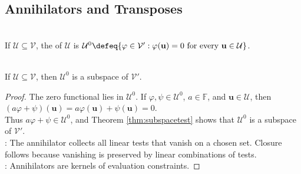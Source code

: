 \subsection{Annihilators and Transposes}
\begin{definition} \\
If $\mathcal{U}\subseteq\mathcal{V}$, the  of $\mathcal{U}$ is $\mathcal{U}^0\defeq\{\varphi\in\mathcal{V}':\varphi(\mathbf{u})=0 \text{ for every } \mathbf{u}\in\mathcal{U}\}$.
\end{definition}

\begin{proposition} \label{prop:annihilator-is-subspace} \\
If $\mathcal{U}\subseteq\mathcal{V}$, then $\mathcal{U}^0$ is a subspace of $\mathcal{V}'$.
\begin{proof}
The zero functional lies in $\mathcal{U}^0$. If $\varphi,\psi\in\mathcal{U}^0$, $a\in\mathbb{F}$, and $\mathbf{u}\in\mathcal{U}$, then $(a\varphi+\psi)(\mathbf{u})=a\varphi(\mathbf{u})+\psi(\mathbf{u})=0$.\\
Thus $a\varphi+\psi\in\mathcal{U}^0$, and Theorem \ref{thm:subspacetest} shows that $\mathcal{U}^0$ is a subspace of $\mathcal{V}'$.\\
: The annihilator collects all linear tests that vanish on a chosen set. Closure follows because vanishing is preserved by linear combinations of tests.\\
: Annihilators are kernels of evaluation constraints.
\end{proof}
\end{proposition}

